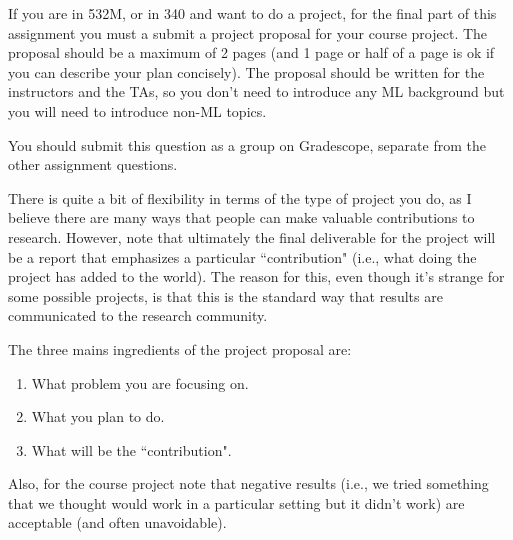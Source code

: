 \documentclass{article}
\def\blu#1{{\color{blu}#1}}
\begin{document}
If you are in 532M, or in 340 and want to do a project, for the final part of this assignment you must a \blu{submit a project proposal} for your course project. The proposal should be a maximum of 2 pages (and 1 page or half of a page is ok if you can describe your plan concisely). The proposal should be written for the instructors and the TAs, so you don't need to introduce any ML background but you will need to introduce non-ML topics.

\blu{You should submit this question as a group on Gradescope, separate from the other assignment questions.}

There is quite a bit of flexibility in terms of the type of project you do, as I believe there are many ways that people can make valuable contributions to research. However, note that ultimately the final deliverable for the project will be a report that emphasizes a particular ``contribution" (i.e., what doing the project has added to the world).
The reason for this, even though it's strange for some possible projects, is that this is the standard way that results are communicated to the research community.

\blu{The three mains ingredients of the project proposal are:
\begin{enumerate}
\item What problem you are focusing on.
\item What you plan to do.
\item What will be the ``contribution".
\end{enumerate}
}
Also, for the course project note that negative results (i.e., we tried something that we thought would work in a particular setting but it didn't work) are acceptable (and often unavoidable).
\end{document}

